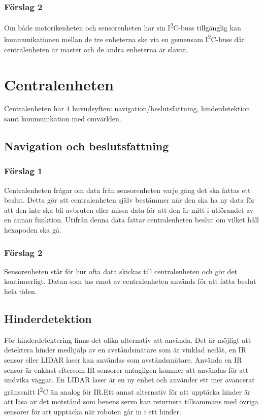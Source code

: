 \documentclass[a4paper,titlepage,12pt]{article}
\newcommand{\itc}{I\textsuperscript{2}C}
\begin{document}
	\subsubsection{Förslag 2}
	Om både motorikenheten och sensorenheten har sin \itc{}-buss tillgänglig kan 
	kommunikationen mellan de tre enheterna ske via en gemensam \itc{}-buss där
	centralenheten är master och de andra enheterna är slavar. 
	
	\section{Centralenheten}
	Centralenheten har 4 huvudsyften: navigation/beslutsfattning, hinderdetektion samt
	kommunikation med omvärlden.

	\subsection{Navigation och beslutsfattning}
  
  \subsubsection{Förslag 1}
  Centralenheten frågar om data från sensorenheten varje gång det ska fattas ett
  beslut. Detta gör att centralenheten själv bestämmer när den ska ha ny data
  för att den inte ska bli avbruten eller missa data för att den är mitt i
  utförandet av en annan funktion. Utifrån denna data fattar centralenheten
  beslut om vilket håll hexapoden ska gå.
  
  \subsubsection{Förslag 2}
  Sensorenheten står för hur ofta data skickas till centralenheten och gör
  det kontinuerligt. Datan som tas emot av centralenheten används för att fatta
  beslut hela tiden. 
  
	\subsection{Hinderdetektion}
	För hinderdetektering finns det olika alternativ att använda. Det är möjligt att 
	detektera hinder medhjälp av en avståndsmätare som är vinklad nedåt, en IR sensor 
	eller LIDAR laser kan användas som avståndsmätare. Använda en IR sensor är enklast 
	eftersom IR sensorer antagligen kommer att användas för att undvika väggar. En 
	LIDAR laser är en ny enhet och använder ett mer avancerat gränssnitt \itc{} än 
	analog för IR.\@ Ett annat alternativ för att upptäcka hinder är att läsa av det 
	motstånd som benens servo kan returnera tillsammans med övriga sensorer för 
	att upptäcka när roboten går in i ett hinder. 
\end{document}
